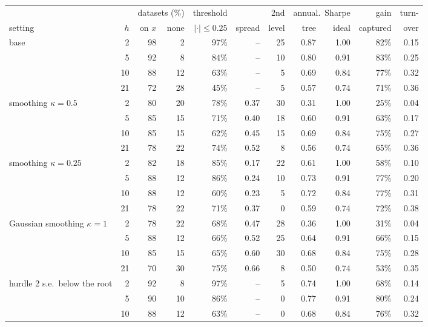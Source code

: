\documentclass[11pt,a4paper]{article}
\newcommand{\1}{\mathbf{1}}
\begin{document}
\begin{table}[H]
\centering\scriptsize
\setlength{\tabcolsep}{2.6pt}
\begin{tabular}{@{}l r rr r r r rr r r@{}}
\toprule
& & \multicolumn{2}{c}{datasets (\%)} & threshold & & 2nd & \multicolumn{2}{c}{annual.\ Sharpe} & gain & turn-\\
\cmidrule(lr){3-4}\cmidrule(lr){8-9}
setting & $h$ & on $x$ & none & $|\cdot|\le0.25$ & spread & level & tree & ideal & captured & over\\
\midrule
base & 2 & 98 & 2 & 97\% & -- & 25 & 0.87 & 1.00 & 82\% & 0.15\\
 & 5 & 92 & 8 & 84\% & -- & 10 & 0.80 & 0.91 & 83\% & 0.25\\
 & 10 & 88 & 12 & 63\% & -- & 5 & 0.69 & 0.84 & 77\% & 0.32\\
 & 21 & 72 & 28 & 45\% & -- & 5 & 0.57 & 0.74 & 71\% & 0.36\\
\midrule
smoothing $\kappa=0.5$ & 2 & 80 & 20 & 78\% & 0.37 & 30 & 0.31 & 1.00 & 25\% & 0.04\\
 & 5 & 85 & 15 & 71\% & 0.40 & 18 & 0.60 & 0.91 & 63\% & 0.17\\
 & 10 & 85 & 15 & 62\% & 0.45 & 15 & 0.69 & 0.84 & 75\% & 0.27\\
 & 21 & 78 & 22 & 74\% & 0.52 & 8 & 0.56 & 0.74 & 65\% & 0.36\\
\midrule
smoothing $\kappa=0.25$ & 2 & 82 & 18 & 85\% & 0.17 & 22 & 0.61 & 1.00 & 58\% & 0.10\\
 & 5 & 88 & 12 & 86\% & 0.24 & 10 & 0.73 & 0.91 & 77\% & 0.20\\
 & 10 & 88 & 12 & 60\% & 0.23 & 5 & 0.72 & 0.84 & 77\% & 0.31\\
 & 21 & 78 & 22 & 71\% & 0.37 & 0 & 0.59 & 0.74 & 72\% & 0.38\\
\midrule
Gaussian smoothing $\kappa=1$ & 2 & 78 & 22 & 68\% & 0.47 & 28 & 0.36 & 1.00 & 31\% & 0.04\\
 & 5 & 88 & 12 & 66\% & 0.52 & 25 & 0.64 & 0.91 & 66\% & 0.15\\
 & 10 & 85 & 15 & 65\% & 0.60 & 30 & 0.68 & 0.84 & 75\% & 0.28\\
 & 21 & 70 & 30 & 75\% & 0.66 & 8 & 0.50 & 0.74 & 53\% & 0.35\\
\midrule
hurdle 2 s.e.\ below the root & 2 & 92 & 8 & 97\% & -- & 5 & 0.74 & 1.00 & 68\% & 0.14\\
 & 5 & 90 & 10 & 86\% & -- & 0 & 0.77 & 0.91 & 80\% & 0.24\\
 & 10 & 88 & 12 & 63\% & -- & 0 & 0.68 & 0.84 & 76\% & 0.32\\

\end{tabular}
\end{table}
\end{document}
